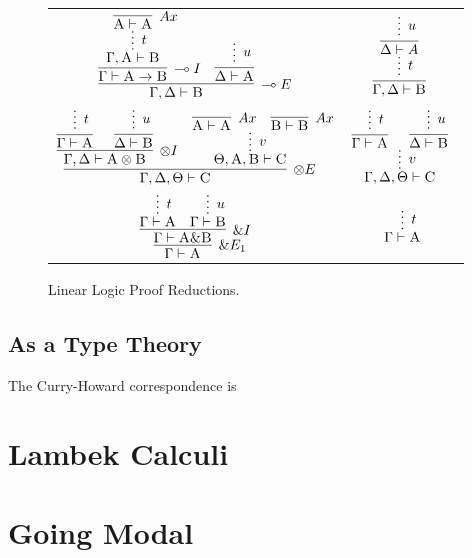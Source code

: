 \begin{figure}
	\centering
	\begin{tabularx}{0.95\textwidth}{@{}c@{~$\implies$~}c@{}}
	$\infer[\li E]{\Gamma, \Delta \vdash \prop{B}}{
	\infer[\li I]{\Gamma \vdash \prop{A} \to \prop{B}}{
		\infer*[t]{\Gamma, \prop{A} \vdash \prop{B}}{
				\infer[Ax]{\prop{A} \vdash \prop{A}}{} 
			}
		}
		&
		\infer{\Delta \vdash \prop{A}}{
			\infer*[u]{}{}
		}
	}$
	&
	$ 
	\infer[]{\Gamma, \Delta \vdash \prop{B}}{
		\infer*[t]{}{
		\infer[]{\Delta \vdash A}{
			\infer*[u]{}{}
		}}
	}
	$\\[2em]
	$
	\infer[\otimes E]{\Gamma, \Delta, \Theta \vdash \prop{C}}{
		\infer[\otimes I]{\Gamma, \Delta \vdash \prop{A} \otimes \prop{B}}{
			\infer[]{\Gamma \vdash \prop{A}}{\infer*[t]{}{}}
			&
			\infer[]{\Delta \vdash \prop{B}}{\infer*[u]{}{}}
		}		
		&
		\infer*[v]{\Theta, \prop{A}, \prop{B} \vdash \prop{C}}{
			\infer[Ax]{\prop{A} \vdash \prop{A}}{}
			&
			\infer[Ax]{\prop{B} \vdash \prop{B}}{}
		}
	}
	$
	&
	$
	\infer*[v]{\Gamma, \Delta, \Theta \vdash \prop{C}}{
		\infer[]{\Gamma \vdash \prop{A}}{
			\infer*[t]{}{}
		}
		&
		\infer[]{\Delta \vdash \prop{B}}{
			\infer*[u]{}{}
		}
	}
	$\\[2em]
	$
	\infer[\with E_1]{\Gamma \vdash \prop{A}}{
		\infer[\with I]{\Gamma \vdash \prop{A} \with \prop{B}}{
			\infer*[t]{\Gamma \vdash \prop{A}}{}
			&
			\infer*[u]{\Gamma \vdash \prop{B}}{}
		}
	}
	$
	&
	$
	\infer*[t]{\Gamma \vdash \prop{A}}{}
	$
	\end{tabularx}
	\caption{Linear Logic Proof Reductions.}
	\label{figure:linear_proof_reductions}
\end{figure}

\subsection{As a Type Theory}
The Curry-Howard correspondence is 


\section{Lambek Calculi}
\section{Going Modal}





